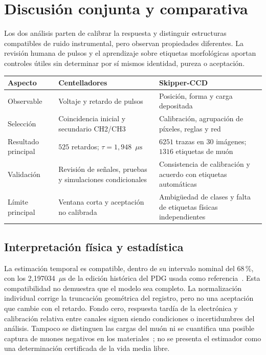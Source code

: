 \documentclass[10pt,a4paper]{article}
\newcommand{\us}{\ensuremath{\mu\mathrm{s}}}
\begin{document}
\section{Discusión conjunta y comparativa}
Los dos análisis parten de calibrar la respuesta y distinguir estructuras compatibles de ruido instrumental, pero observan propiedades diferentes. La revisión humana de pulsos y el aprendizaje sobre etiquetas morfológicas aportan controles útiles sin determinar por sí mismos identidad, pureza o aceptación.
\begin{center}\small
\begin{tabularx}{\textwidth}{@{}lXX@{}}\toprule
Aspecto & Centelladores & Skipper-CCD \\\midrule
Observable & Voltaje y retardo de pulsos & Posición, forma y carga depositada \\
Selección & Coincidencia inicial y secundario CH2/CH3 & Calibración, agrupación de píxeles, reglas y red \\
Resultado principal & $525$ retardos; $\tau=1{,}948$~\us & $6251$ trazas en 30 imágenes; $1316$ etiquetas de muón \\
Validación & Revisión de señales, pruebas y simulaciones condicionales & Consistencia de calibración y acuerdo con etiquetas automáticas \\
Límite principal & Ventana corta y aceptación no calibrada & Ambigüedad de clases y falta de etiquetas físicas independientes \\\bottomrule
\end{tabularx}\end{center}

\subsection{Interpretación física y estadística}
La estimación temporal es compatible, dentro de su intervalo nominal del 68\,\%, con los 2{,}197034~\us{} de la edición histórica del PDG usada como referencia~\cite{pdg}. Esta compatibilidad no demuestra que el modelo sea completo. La normalización individual corrige la truncación geométrica del registro, pero no una aceptación que cambie con el retardo. Fondo cero, respuesta tardía de la electrónica y calibración relativa entre canales siguen siendo condiciones o incertidumbres del análisis. Tampoco se distinguen las cargas del muón ni se cuantifica una posible captura de muones negativos en los materiales~\cite{capture}; no se presenta el estimador como una determinación certificada de la vida media libre.
\end{document}
